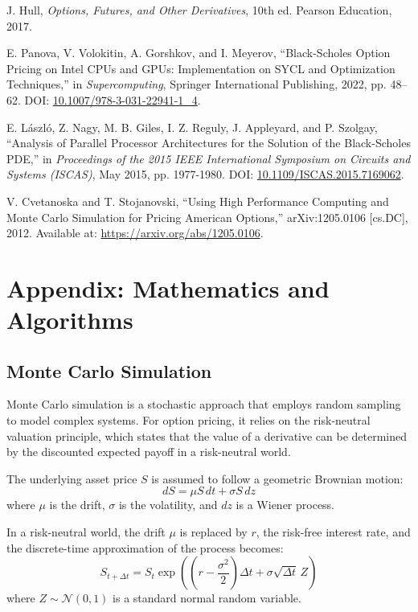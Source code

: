 \documentclass[12pt,a4paper]{report}
\begin{document}
\begin{thebibliography}{9}

J. Hull, \textit{Options, Futures, and Other Derivatives}, 10th ed. Pearson Education, 2017.

E. Panova, V. Volokitin, A. Gorshkov, and I. Meyerov, ``Black-Scholes Option Pricing on Intel CPUs and GPUs: Implementation on SYCL and Optimization Techniques,'' in \textit{Supercomputing}, Springer International Publishing, 2022, pp. 48–62. DOI: \url{10.1007/978-3-031-22941-1_4}.

E. László, Z. Nagy, M. B. Giles, I. Z. Reguly, J. Appleyard, and P. Szolgay, ``Analysis of Parallel Processor Architectures for the Solution of the Black-Scholes PDE,'' in \textit{Proceedings of the 2015 IEEE International Symposium on Circuits and Systems (ISCAS)}, May 2015, pp. 1977-1980. DOI: \url{10.1109/ISCAS.2015.7169062}.

V. Cvetanoska and T. Stojanovski, ``Using High Performance Computing and Monte Carlo Simulation for Pricing American Options,'' arXiv:1205.0106 [cs.DC], 2012. Available at: \url{https://arxiv.org/abs/1205.0106}.

\end{thebibliography}



\appendix
\chapter{Appendix: Mathematics and Algorithms}

\section{Monte Carlo Simulation}

Monte Carlo simulation is a stochastic approach that employs random sampling to model complex systems. For option pricing, it relies on the risk-neutral valuation principle, which states that the value of a derivative can be determined by the discounted expected payoff in a risk-neutral world.

The underlying asset price \( S \) is assumed to follow a geometric Brownian motion:
\[
dS = \mu S \, dt + \sigma S \, dz
\]
where \( \mu \) is the drift, \( \sigma \) is the volatility, and \( dz \) is a Wiener process.

In a risk-neutral world, the drift \( \mu \) is replaced by \( r \), the risk-free interest rate, and the discrete-time approximation of the process becomes:
\[
S_{t+\Delta t} = S_t \exp \left( \left( r - \frac{\sigma^2}{2} \right) \Delta t + \sigma \sqrt{\Delta t} \, Z \right)
\]
where \( Z \sim \mathcal{N}(0, 1) \) is a standard normal random variable.
\end{document}
